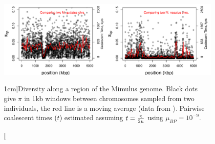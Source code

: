\begin{figure}
\begin{center}
  \includegraphics[width = \textwidth]{figures/Genetic_drift/Demography/Mimulus_coalescent_times.pdf}
\end{center}
\caption[][1cm]{Diversity along a region of the Mimulus genome. Black dots give $\pi$ in 1kb windows between chromosomes sampled from two individuals, the red line is a
  moving average (data from  \citeauthor{brandvain:14}). Pairwise coalescent times ($t$) estimated assuming $t= \nicefrac{\pi}{2 \mu} $ using $\mu_{BP}=10^{-9}$.  } \label{fig:Mimulus_bottleneck}
\end{figure}

